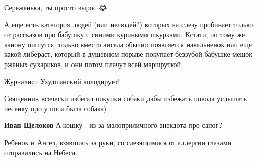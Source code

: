 \begin{itemize}
Сереженька, ты просто вырос 😂🤣

 

А еще есть категория людей (или нелюдей?) которых на слезу пробивает только от
рассказов про бабушку с синими куриными шкурками. Кстати, по тому же канону
пишутся, только вместо ангела обычно появляется навальненок или еще какой
либераст, который в душевном порыве покупает беззубой бабушке мешок ржаных
сухариков, и они потом плачут всей маршруткой


 
Журналист Ухудшанский аплодирует!👏👏👏

 

Священник всячески избегал покупки собаки дабы избежать повода услышать песенку
про у попа была собака)

\begin{itemize}
 
\textbf{Иван Щелоков}
А кошку - из-за малоприличного анекдота про сапог?
\end{itemize}

 
Ребенок и Ангел, взявшись за руки, со слезящимися от аллергии глазами отправились на Небеса.

 

\end{itemize}
